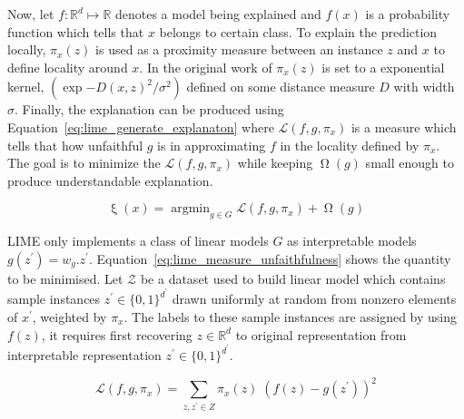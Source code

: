 \documentclass[english]{tktltiki2}
\theoremstyle{definition}
\theoremstyle{remark}
\newcommand{\onespace}{\;}
\DeclareMathOperator*{\argmin}{argmin}
\begin{document}
Now, let $f: \mathbb{R}^d \mapsto \mathbb{R}$ denotes a model being explained and $f(x)$ is a probability function which tells that $x$ belongs to certain class. To explain the prediction locally, $\pi_x(z)$ is used as a proximity measure between an instance $z$ and $x$ to define locality around $x$. In the original work of \citet{ribeiro2016should} $\pi_x(z)$ is set to a exponential kernel, $(\exp{-D(x,z)^2/\sigma^2})$ defined on some distance measure $D$ with width $\sigma$. Finally, the explanation can be produced using Equation~\eqref{eq:lime_generate_explanaton} where $\mathcal{L}(f, g, \pi_x)$ is a measure which tells that how unfaithful $g$ is in approximating $f$ in the locality defined by $\pi_x$. The goal is to minimize the $\mathcal{L}(f, g, \pi_x)$ while keeping $\upOmega(g)$ small enough to produce understandable explanation.

\begin{equation}\label{eq:lime_generate_explanaton}
\mathsf{\upxi}(x) = \argmin_{g \in G} \mathcal{L}(f, g, \pi_x) + \upOmega(g)
\end{equation}

LIME \citep{ribeiro2016should} only implements a class of linear models $G$ as interpretable models $g(z^\prime)=w_g.z^\prime$. Equation~\eqref{eq:lime_measure_unfaithfulness} shows the quantity to be minimised. Let $\mathcal{Z}$ be a dataset used to build linear model which contains sample instances $z^\prime \in \{0, 1\}^{d^\prime}$ drawn uniformly at random from nonzero elements of $x^\prime$, weighted by $\pi_x$. The labels to these sample instances are assigned by using $f(z)$, it requires first recovering $z \in \mathbb{R}^d$ to original representation from interpretable representation  $z^\prime \in \{0, 1\}^{d^\prime}$. 

\begin{equation}\label{eq:lime_measure_unfaithfulness}
\mathcal{L}(f, g, \pi_x) = \sum_{z, z^\prime \in Z} \pi_x(z)\onespace(f(z) - g(z^\prime))^2
\end{equation}

\end{document}

